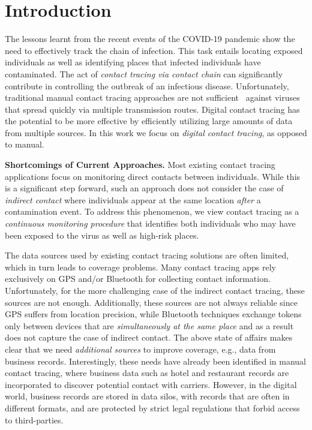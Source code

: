 \section{Introduction}

The lessons learnt from the recent events of the COVID-19 pandemic show the need to effectively track the chain of infection.
This task entails locating exposed individuals as well as identifying places that infected individuals have contaminated. 
The act of \emph{contact tracing via contact chain} can  significantly contribute in controlling the outbreak of an infectious disease. Unfortunately, traditional manual contact tracing approaches are not sufficient~\cite{Farrahi2014} against viruses that spread quickly via multiple transmission routes.  Digital contact tracing has the potential to be more effective by efficiently utilizing large amounts of data from multiple sources. In this work we focus on \emph{digital contact tracing}, as opposed to manual.

\textbf{Shortcomings of Current Approaches.} Most existing contact tracing applications focus on monitoring direct contacts between individuals. 
While this is a significant step forward, such an  approach does not consider the case of \emph{indirect contact} where individuals appear at the same location \emph{after} a contamination event. To address this phenomenon, we view contact tracing as a \emph{continuous monitoring procedure} that identifies both individuals who may have been exposed to the virus as well as high-risk places. %

The data sources used by existing contact tracing solutions are often limited, which in turn leads to coverage problems. Many contact tracing apps rely exclusively on GPS and/or Bluetooth for collecting contact information. Unfortunately, for the more challenging case of the indirect contact tracing, these sources are not enough. Additionally, these sources are not always reliable since GPS suffers from location precision, while Bluetooth techniques exchange tokens only between devices that are \emph{simultaneously at the same place} and as a result does not capture the case of indirect contact. The above state of affairs makes clear that we need \emph{additional sources} to improve coverage, e.g., data from business records. Interestingly, these needs have already been identified in manual contact tracing, where business data such as hotel and restaurant records are incorporated to discover potential contact with carriers. However, in the digital world, business records are stored in data silos, with records that are often in different formats, and are protected by strict legal regulations that forbid access to third-parties.

